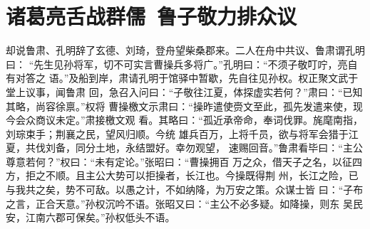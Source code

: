 \chapter{诸葛亮舌战群儒~鲁子敬力排众议}

却说鲁肃、孔明辞了玄德、刘琦，登舟望柴桑郡来。二人在舟中共议、鲁肃谓孔明曰：
“先生见孙将军，切不可实言曹操兵多将广。”孔明曰：“不须子敬叮咛，亮自有对答之
语。”及船到岸，肃请孔明于馆驿中暂歇，先自往见孙权。权正聚文武于堂上议事，闻鲁肃
回，急召入问曰：“子敬往江夏，体探虚实若何？”肃曰：“已知其略，尚容徐禀。”权将
曹操檄文示肃曰：“操昨遣使赍文至此，孤先发遣来使，现今会众商议未定。”肃接檄文观
看。其略曰：“孤近承帝命，奉词伐罪。旄麾南指，刘琮束手；荆襄之民，望风归顺。今统
雄兵百万，上将千员，欲与将军会猎于江夏，共伐刘备，同分土地，永结盟好。幸勿观望，
速赐回音。”鲁肃看毕曰：“主公尊意若何？”权曰：“未有定论。”张昭曰：“曹操拥百
万之众，借天子之名，以征四方，拒之不顺。且主公大势可以拒操者，长江也。今操既得荆
州，长江之险，已与我共之矣，势不可敌。以愚之计，不如纳降，为万安之策。众谋士皆
曰：“子布之言，正合天意。”孙权沉吟不语。张昭又曰：“主公不必多疑。如降操，则东
吴民安，江南六郡可保矣。”孙权低头不语。

